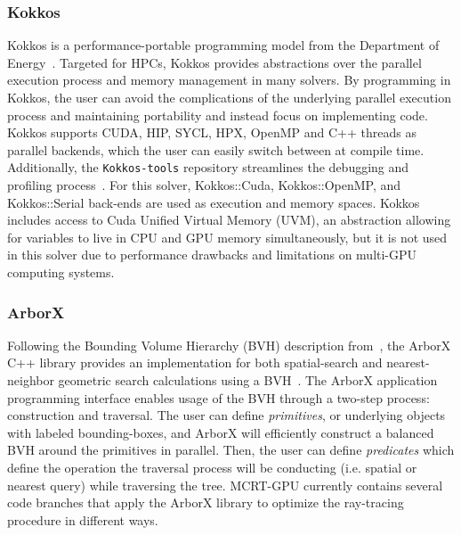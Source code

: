 \subsubsection{Kokkos}
Kokkos is a performance-portable programming model from the Department of Energy~\cite{Trott_Kokkos3_2022,TrottKokkosOGPaper2014}. 
Targeted for HPCs, Kokkos provides abstractions over the parallel execution process and memory management in many solvers. By programming in Kokkos, the user can avoid the complications of the underlying parallel execution process and maintaining portability and instead focus on implementing code.
Kokkos supports CUDA, HIP, SYCL, HPX, OpenMP and C++ threads as parallel backends, which the user can easily switch between at compile time. Additionally, the \verb|Kokkos-tools| repository streamlines the debugging and profiling process~\cite{Trott_KokkosEcosystem2021}. For this solver, Kokkos::Cuda, Kokkos::OpenMP, and Kokkos::Serial back-ends are used as execution 
and memory spaces. Kokkos includes access to Cuda Unified Virtual Memory (UVM), an abstraction allowing for variables to live in CPU and GPU memory simultaneously, but it is not used in this solver due to performance drawbacks and limitations on multi-GPU computing systems.

\subsubsection{ArborX}
Following the Bounding Volume Hierarchy (BVH) description from~\citet{Karras2012MaximizingTrees}, the ArborX C++ library provides an implementation for both spatial-search and nearest-neighbor geometric search calculations using a BVH~\cite{Lebrun-Grandie2019ArborX:Library}. 
The ArborX application programming interface enables usage of the BVH through a two-step process: construction and traversal. The user can define \textit{primitives}, or underlying objects with labeled bounding-boxes, and ArborX will efficiently construct a balanced BVH around the primitives in parallel. Then, the user can define \textit{predicates} which define the operation the traversal process will be conducting (i.e. spatial or nearest query) while traversing the tree.
MCRT-GPU currently contains several code branches that apply the ArborX library to optimize the ray-tracing procedure in different ways.

